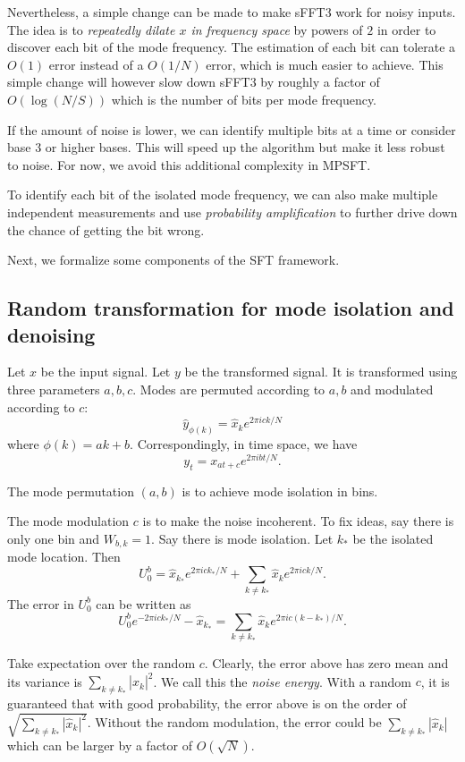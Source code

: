 \documentclass[10pt]{article}
\begin{document}
Nevertheless, a simple change can be made to make sFFT3 work for noisy inputs. The idea is to \emph{repeatedly dilate $x$ in frequency space} by powers of $2$ in order to discover each bit of the mode frequency. The estimation of each bit can tolerate a $O(1)$ error instead of a $O(1/N)$ error, which is much easier to achieve. This simple change will however slow down sFFT3 by roughly a factor of $O(\log (N/S))$ which is the number of bits per mode frequency.

If the amount of noise is lower, we can identify multiple bits at a time or consider base 3 or higher bases. This will speed up the algorithm but make it less robust to noise. For now, we avoid this additional complexity in MPSFT.

To identify each bit of the isolated mode frequency, we can also make multiple independent measurements and use \emph{probability amplification} to further drive down the chance of getting the bit wrong.

Next, we formalize some components of the SFT framework.

\subsection{Random transformation for mode isolation and denoising}\label{sec:transform}
Let $x$ be the input signal. Let $y$ be the transformed signal. It is transformed using three parameters $a,b,c$. Modes are permuted according to $a, b$ and modulated according to $c$:
$$\hat{y}_{\phi(k)} = \hat{x}_k e^{2\pi i ck/N}$$
where $\phi(k) = ak+b$. Correspondingly, in time space, we have
$$y_t = x_{at+c} e^{2\pi i bt/N}.$$

The mode permutation $(a,b)$ is to achieve mode isolation in bins.

The mode modulation $c$ is to make the noise incoherent. To fix ideas, say there is only one bin and $W_{b,k}=1$. Say there is mode isolation. Let $k_*$ be the isolated mode location. Then
$$U^b_0 = \hat{x}_{k_*}e^{2\pi i c k_*/N} + \sum_{k\neq k_*} \hat{x}_k e^{2\pi i c k/N}.$$
The error in $U^b_0$ can be written as
$$U^b_0 e^{-2\pi i c k_*/N} -\hat{x}_{k_*} = \sum_{k\neq k_*} \hat{x}_k e^{2\pi i c(k-k_*)/N}.$$

Take expectation over the random $c$. Clearly, the error above has zero mean and its variance is $\sum_{k\neq k_*} |\hat{x}_k|^2$. We call this the \emph{noise energy}. With a random $c$, it is guaranteed that with good probability, the error above is on the order of $\sqrt{\sum_{k\neq k_*} |\hat{x}_k|^2}$. Without the random modulation, the error could be $\sum_{k\neq k_*} |\hat{x}_k|$ which can be larger by a factor of $O(\sqrt{N})$.
\end{document}
